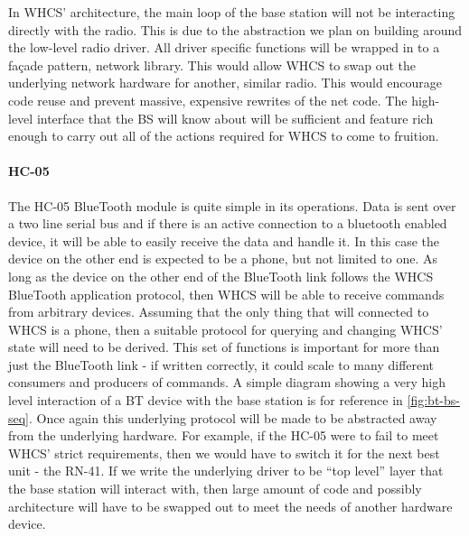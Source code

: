 In WHCS' architecture, the main loop of the base station will not be
interacting directly with the radio. This is due to the abstraction we plan on
building around the low-level radio driver. All driver specific functions will
be wrapped in to a fa\c{c}ade pattern, network library. This would allow WHCS
to swap out the underlying network hardware for another, similar radio. This
would encourage code reuse and prevent massive, expensive rewrites of the
net code. The high-level interface that the BS will know about will be
sufficient and feature rich enough to carry out all of the actions required for
WHCS to come to fruition.

\paragraph{HC-05}
The HC-05 BlueTooth module is quite simple in its operations. Data is sent over
a two line serial bus and if there is an active connection to a bluetooth
enabled device, it will be able to easily receive the data and handle it. In
this case the device on the other end is expected to be a phone, but not
limited to one. As long as the device on the other end of the BlueTooth link
follows the WHCS BlueTooth application protocol, then WHCS will be able to
receive commands from arbitrary devices. Assuming that the only thing that will
connected to WHCS is a phone, then a suitable protocol for querying and
changing WHCS' state will need to be derived. This set of functions is
important for more than just the BlueTooth link - if written correctly, it
could scale to many different consumers and producers of commands. A simple
diagram showing a very high level interaction of a BT device with the base
station is for reference in \autoref{fig:bt-bs-seq}. Once again
this underlying protocol will be made to be abstracted away from the underlying
hardware. For example, if the HC-05 were to fail to meet WHCS' strict
requirements, then we would have to switch it for the next best unit - the
RN-41. If we write the underlying driver to be ``top level'' layer that the
base station will interact with, then large amount of code and possibly
architecture will have to be swapped out to meet the needs of another hardware
device.


